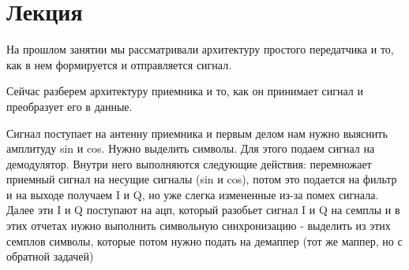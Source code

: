 \chapter{Лекция}
\label{ch:intro}

На прошлом занятии мы рассматривали архитектуру простого передатчика и то, как в нем формируется и отправляется сигнал.

Сейчас разберем архитектуру приемника и то, как он принимает сигнал и преобразует его в данные.

Сигнал поступает на антенну приемника и первым делом нам нужно выяснить амплитуду sin и cos.
Нужно выделить символы. Для этого подаем сигнал на демодулятор. Внутри него выполняются
следующие действия: перемножает приемный сигнал на несущие сигналы (sin и cos), потом это
подается на фильтр и на выходе получаем I и Q, но уже слегка измененные из-за помех сигнала.
Далее эти I и Q поступают на ацп, который разобьет сигнал I и Q на семплы и в этих отчетах
нужно выполнить символьную синхронизацию - выделить из этих семплов символы, которые потом
нужно подать на демаппер (тот же маппер, но с обратной задачей)
\endinput